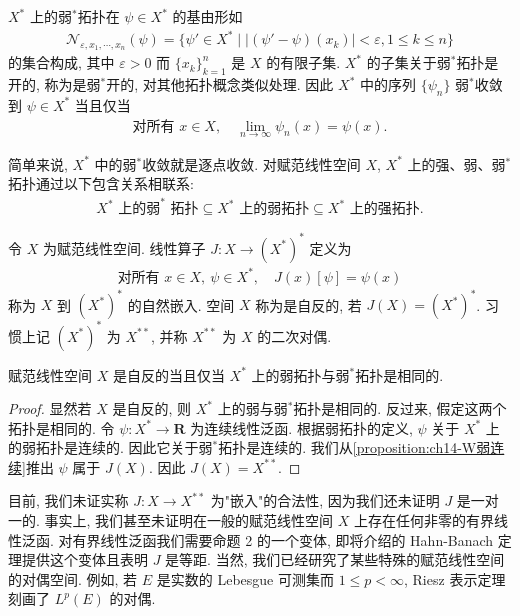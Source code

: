 \documentclass[../../main.tex]{subfiles}
\begin{document}
$X^{*}$ 上的弱$^{*}$拓扑在 $\psi\in X^{*}$ 的基由形如
\begin{align}
\mathcal{N}_{\varepsilon,x_{1},\cdots,x_{n}}(\psi)=\{\psi'\in X^{*}\mid|(\psi'-\psi)(x_{k})|<\varepsilon,1\leqslant k\leqslant n\}\label{align:ch14-弱星基}
\end{align}
的集合构成, 其中 $\varepsilon>0$ 而 $\{x_{k}\}_{k=1}^{n}$ 是 $X$ 的有限子集. $X^{*}$ 的子集关于弱$^{*}$拓扑是开的, 称为是弱$^{*}$开的, 对其他拓扑概念类似处理. 因此 $X^{*}$ 中的序列 $\{\psi_{n}\}$ 弱$^{*}$收敛到 $\psi\in X^{*}$ 当且仅当
\begin{align}
\text{对所有 }x\in X,\quad\lim_{n\to\infty}\psi_{n}(x)=\psi(x).\label{align:ch14-弱星收敛}
\end{align}

简单来说, $X^{*}$ 中的弱$^{*}$收敛就是逐点收敛. 对赋范线性空间 $X$, $X^{*}$ 上的强、弱、弱$^{*}$拓扑通过以下包含关系相联系:
\begin{align*}
X^{*}\text{ 上的弱}^{*}\text{ 拓扑}\subseteq X^{*}\text{ 上的弱拓扑}\subseteq X^{*}\text{ 上的强拓扑}.
\end{align*}

\begin{definition}[自然嵌入]\label{definition:ch14-自然嵌入}
令 $X$ 为赋范线性空间. 线性算子 $J:X\to(X^{*})^{*}$ 定义为
\begin{align*}
\text{对所有 }x\in X,\ \psi\in X^{*},\quad J(x)[\psi]=\psi(x)
\end{align*}
称为 $X$ 到 $(X^{*})^{*}$ 的自然嵌入. 空间 $X$ 称为是自反的, 若 $J(X)=(X^{*})^{*}$. 习惯上记 $(X^{*})^{*}$ 为 $X^{**}$, 并称 $X^{**}$ 为 $X$ 的二次对偶.
\end{definition}

\begin{proposition}\label{proposition:ch14-自反弱星}
赋范线性空间 $X$ 是自反的当且仅当 $X^{*}$ 上的弱拓扑与弱$^{*}$拓扑是相同的.
\end{proposition}

\begin{proof}
显然若 $X$ 是自反的, 则 $X^{*}$ 上的弱与弱$^{*}$拓扑是相同的. 反过来, 假定这两个拓扑是相同的. 令 $\psi:X^{*}\to\mathbf{R}$ 为连续线性泛函. 根据弱拓扑的定义, $\psi$ 关于 $X^{*}$ 上的弱拓扑是连续的. 因此它关于弱$^{*}$拓扑是连续的. 我们从\cref{proposition:ch14-W弱连续}推出 $\psi$ 属于 $J(X)$. 因此 $J(X)=X^{**}$.
\end{proof}

目前, 我们未证实称 $J:X\to X^{**}$ 为"嵌入"的合法性, 因为我们还未证明 $J$ 是一对一的. 事实上, 我们甚至未证明在一般的赋范线性空间 $X$ 上存在任何非零的有界线性泛函. 对有界线性泛函我们需要命题 2 的一个变体, 即将介绍的 Hahn-Banach 定理提供这个变体且表明 $J$ 是等距. 当然, 我们已经研究了某些特殊的赋范线性空间的对偶空间. 例如, 若 $E$ 是实数的 Lebesgue 可测集而 $1\leqslant p<\infty$, Riesz 表示定理刻画了 $L^{p}(E)$ 的对偶.
\end{document}
